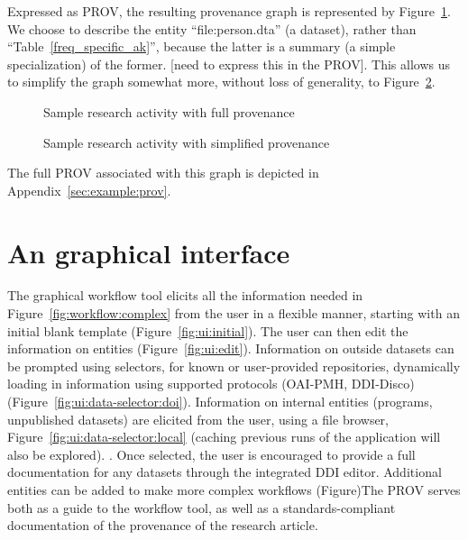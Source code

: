 \documentclass[x11names]{article}
\begin{document}


Expressed as PROV, the resulting provenance graph is represented by 
Figure~\ref{fig:author:example}. We choose to describe the entity ``file:person.dta'' (a dataset), 
rather than ``Table~\ref{freq_specific_ak}'', because the latter is a summary (a simple 
specialization) of the former.  [need to express this in the PROV]. This allows us to simplify the 
graph somewhat more, without loss of generality, to Figure~\ref{fig:author:example:simple}. 

\begin{figure}
\centering
\caption{Sample research activity with full provenance}\label{fig:author:example}

\end{figure}

\begin{figure}
\centering
\caption{Sample research activity with simplified provenance}\label{fig:author:example:simple}

\end{figure}

The full PROV associated with this graph is depicted in Appendix~\ref{sec:example:prov}.

\section{An graphical interface}
\label{sec:interface}

The graphical workflow tool elicits all the information needed in Figure~\ref{fig:workflow:complex} from the user in a flexible manner, starting with an initial blank template (Figure~\ref{fig:ui:initial}). The user can then edit the information on entities (Figure~\ref{fig:ui:edit}). Information on outside datasets can be prompted using selectors, for known or user-provided repositories, dynamically loading in information using supported protocols (OAI-PMH, DDI-Disco) (Figure~\ref{fig:ui:data-selector:doi}). Information on internal entities (programs, unpublished datasets) are elicited from the user, using a file browser, Figure~\ref{fig:ui:data-selector:local} (caching previous runs of the application will also be explored). . Once selected, the user is encouraged to provide a full documentation for any datasets through the integrated DDI editor. Additional entities can be added to make more complex workflows (Figure)The PROV serves both as a guide to the workflow tool, as well as a standards-compliant documentation of the provenance of the research article.
\end{document}
